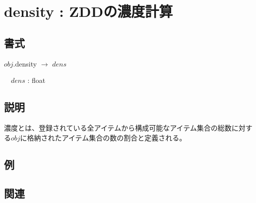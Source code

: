 
\section{density : ZDDの濃度計算\label{sect:density}}
\subsection*{書式}
$obj$.density $\rightarrow$ $dens$

~~$dens$ : float

\subsection*{説明}
濃度とは、登録されている全アイテムから構成可能なアイテム集合の総数に対する$obj$に格納されたアイテム集合の数の割合と定義される。

\subsection*{例}


\subsection*{関連}


